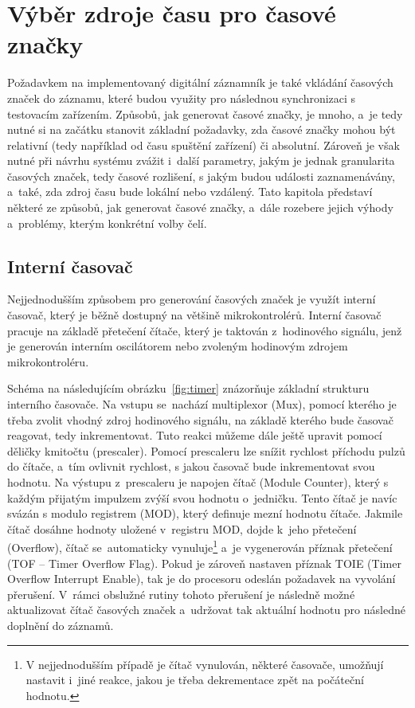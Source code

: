 \section{Výběr zdroje času pro časové značky}
\label{zdroje_casu}
Požadavkem na implementovaný digitální záznamník je také vkládání časových značek do záznamu, které budou využity pro následnou synchronizaci s testovacím zařízením. Způsobů, jak generovat časové značky, je mnoho, a~je tedy nutné si na začátku stanovit základní požadavky, zda časové značky mohou být relativní (tedy například od času spuštění zařízení) či absolutní. Zároveň je však nutné při návrhu systému zvážit i~další parametry, jakým je jednak granularita časových značek, tedy časové rozlišení, s jakým budou události zaznamenávány, a~také, zda zdroj času bude lokální nebo vzdálený. Tato kapitola představí některé ze způsobů, jak generovat časové značky, a~dále rozebere jejich výhody a~problémy, kterým konkrétní volby čelí. 

\subsection{Interní časovač}
Nejjednodušším způsobem pro generování časových značek je využít interní časovač, který je běžně dostupný na většině mikrokontrolérů. Interní časovač pracuje na základě přetečení čítače, který je taktován z~hodinového signálu, jenž je generován interním oscilátorem nebo zvoleným hodinovým zdrojem mikrokontroléru.~\cite{nxp_KL05_Reference_Manual}

Schéma na následujícím obrázku~\ref{fig:timer} znázorňuje základní strukturu interního časovače. Na vstupu se~nachází multiplexor (Mux), pomocí kterého je třeba zvolit vhodný zdroj hodinového signálu, na základě kterého bude časovač reagovat, tedy inkrementovat. Tuto reakci můžeme dále ještě upravit pomocí děličky kmitočtu (prescaler). Pomocí prescaleru lze snížit rychlost příchodu pulzů do čítače, a~tím ovlivnit rychlost, s jakou časovač bude inkrementovat svou hodnotu. Na výstupu z~prescaleru je napojen čítač (Module Counter), který s každým přijatým impulzem zvýší svou hodnotu o~jedničku. Tento čítač je navíc svázán s modulo registrem (MOD), který definuje mezní hodnotu čítače. Jakmile čítač dosáhne hodnoty uložené v~registru MOD, dojde k~jeho přetečení (Overflow), čítač se~automaticky vynuluje\footnote{V nejjednodušším případě je čítač vynulován, některé časovače, umožňují nastavit i~jiné reakce, jakou je třeba dekrementace zpět na počáteční hodnotu.} a~je vygenerován příznak přetečení (TOF -- Timer Overflow Flag). Pokud je zároveň nastaven příznak TOIE (Timer Overflow Interrupt Enable), tak je do procesoru odeslán požadavek na vyvolání přerušení. V~rámci obslužné rutiny tohoto přerušení je následně možné aktualizovat čítač časových značek a~udržovat tak aktuální hodnotu pro následné doplnění do záznamů.~\cite{nxp_KL05_Reference_Manual}

